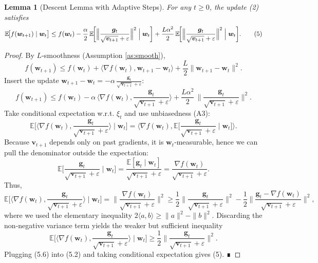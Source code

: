 \documentclass{article}
\newtheorem{lemma}{Lemma}
\newcommand{\E}{\mathbb{E}}
\begin{document}
\begin{lemma}[Descent Lemma with Adaptive Steps]\label{lem:descent}
For any $t\ge0$, the update (2) satisfies
\[
\E\!\big[f(\bm w_{t+1})\mid\bm w_{t}\big]
\le f(\bm w_{t}) -\frac{\alpha}{2}\,
\E\!\bigg[\Big\|\frac{\bm g_{t}}{\sqrt{\bm v_{t+1}}+\varepsilon}\Big\|^{2}\Bigm|\bm w_{t}\bigg]
+\frac{L\alpha^{2}}{2}\,
\E\!\bigg[\Big\|\frac{\bm g_{t}}{\sqrt{\bm v_{t+1}}+\varepsilon}\Big\|^{2}\Bigm|\bm w_{t}\bigg].
\tag{5}
\]
\end{lemma}
\begin{proof}
By $L$‑smoothness (Assumption \ref{as:smooth}),
\[
f(\bm w_{t+1})\le f(\bm w_{t})+\langle\nabla f(\bm w_{t}),\bm w_{t+1}-\bm w_{t}\rangle
+\frac{L}{2}\|\bm w_{t+1}-\bm w_{t}\|^{2}.
\tag{5.1}
\]
Insert the update $\bm w_{t+1}-\bm w_{t}= -\alpha\,
\frac{\bm g_{t}}{\sqrt{\bm v_{t+1}}+\varepsilon}$:
\[
f(\bm w_{t+1})\le f(\bm w_{t}) -\alpha\,
\Big\langle\nabla f(\bm w_{t}),\frac{\bm g_{t}}{\sqrt{\bm v_{t+1}}+\varepsilon}\Big\rangle
+\frac{L\alpha^{2}}{2}\,
\Big\|\frac{\bm g_{t}}{\sqrt{\bm v_{t+1}}+\varepsilon}\Big\|^{2}.
\tag{5.2}
\]
Take conditional expectation w.r.t. $\xi_{t}$ and use unbiasedness (A3):
\[
\E\!\big[\langle\nabla f(\bm w_{t}),\frac{\bm g_{t}}{\sqrt{\bm v_{t+1}}+\varepsilon}\rangle\mid\bm w_{t}\big]
=
\Big\langle\nabla f(\bm w_{t}),\E\!\big[\frac{\bm g_{t}}{\sqrt{\bm v_{t+1}}+\varepsilon}\mid\bm w_{t}\big]\Big\rangle.
\tag{5.3}
\]
Because $\bm v_{t+1}$ depends only on past gradients, it is $\bm w_{t}$‑measurable,
hence we can pull the denominator outside the expectation:
\[
\E\!\big[\frac{\bm g_{t}}{\sqrt{\bm v_{t+1}}+\varepsilon}\mid\bm w_{t}\big]
=
\frac{\E[\bm g_{t}\mid\bm w_{t}]}{\sqrt{\bm v_{t+1}}+\varepsilon}
=
\frac{\nabla f(\bm w_{t})}{\sqrt{\bm v_{t+1}}+\varepsilon}.
\tag{5.4}
\]
Thus,
\[
\E\!\big[\langle\nabla f(\bm w_{t}),\frac{\bm g_{t}}{\sqrt{\bm v_{t+1}}+\varepsilon}\rangle\mid\bm w_{t}\big]
=
\Big\|\frac{\nabla f(\bm w_{t})}{\sqrt{\bm v_{t+1}}+\varepsilon}\Big\|^{2}
\ge
\frac12\Big\|\frac{\bm g_{t}}{\sqrt{\bm v_{t+1}}+\varepsilon}\Big\|^{2}
-\frac12\Big\|\frac{\bm g_{t}-\nabla f(\bm w_{t})}{\sqrt{\bm v_{t+1}}+\varepsilon}\Big\|^{2},
\tag{5.5}
\]
where we used the elementary inequality
$2\langle a,b\rangle\ge\|a\|^{2}-\|b\|^{2}$.
Discarding the non‑negative variance term yields the weaker but sufficient
inequality
\[
\E\!\big[\langle\nabla f(\bm w_{t}),\frac{\bm g_{t}}{\sqrt{\bm v_{t+1}}+\varepsilon}\rangle\mid\bm w_{t}\big]
\ge
\frac12\Big\|\frac{\bm g_{t}}{\sqrt{\bm v_{t+1}}+\varepsilon}\Big\|^{2}.
\tag{5.6}
\]
Plugging (5.6) into (5.2) and taking conditional expectation gives (5). ∎
\end{proof}
\end{document}
